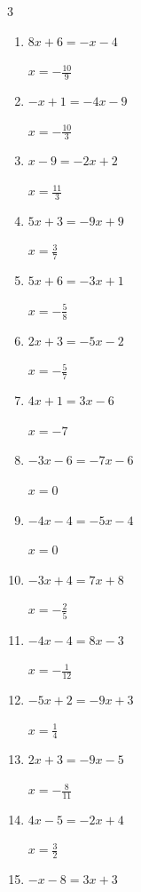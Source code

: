 \begin{multicols}{3}
\begin{enumerate}
  \item $8x+6=-x-4$

        $\displaystyle x=-\frac{10}{9}$

  \item $-x+1=-4x-9$

        $\displaystyle x=-\frac{10}{3}$

  \item $x-9=-2x+2$

        $\displaystyle x=\frac{11}{3}$

  \item $5x+3=-9x+9$

        $\displaystyle x=\frac{3}{7}$

  \item $5x+6=-3x+1$

        $\displaystyle x=-\frac{5}{8}$

  \item $2x+3=-5x-2$

        $\displaystyle x=-\frac{5}{7}$

  \item $4x+1=3x-6$

        $\displaystyle x=-7$

  \item $-3x-6=-7x-6$

        $\displaystyle x=0$

  \item $-4x-4=-5x-4$

        $\displaystyle x=0$

  \item $-3x+4=7x+8$

        $\displaystyle x=-\frac{2}{5}$

  \item $-4x-4=8x-3$

        $\displaystyle x=-\frac{1}{12}$

  \item $-5x+2=-9x+3$

        $\displaystyle x=\frac{1}{4}$

  \item $2x+3=-9x-5$

        $\displaystyle x=-\frac{8}{11}$

  \item $4x-5=-2x+4$

        $\displaystyle x=\frac{3}{2}$

  \item $-x-8=3x+3$


\end{enumerate}
\end{multicols}
